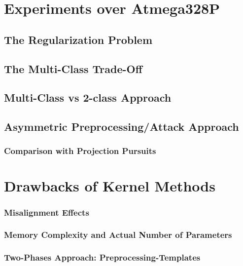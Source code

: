 \section{Experiments over Atmega328P}
\subsection{The Regularization Problem}
\subsection{The Multi-Class Trade-Off}
\subsection{Multi-Class vs 2-class Approach}
\subsection{Asymmetric Preprocessing/Attack Approach}
\subsubsection{Comparison with Projection Pursuits}


\section{Drawbacks of Kernel Methods}
\subsubsection{Misalignment Effects}
\subsubsection{Memory Complexity and Actual Number of Parameters}
\subsubsection{Two-Phases Approach: Preprocessing-Templates}
